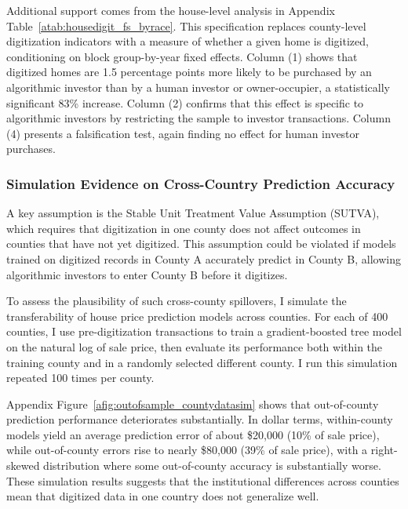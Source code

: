 \documentclass[11pt]{article}
\begin{document}
Additional support comes from the house-level analysis in Appendix Table~\ref{atab:housedigit_fs_byrace}. This specification replaces county-level digitization indicators with a measure of whether a given home is digitized, conditioning on block group-by-year fixed effects. Column (1) shows that digitized homes are 1.5 percentage points more likely to be purchased by an algorithmic investor than by a human investor or owner-occupier, a statistically significant 83\% increase. Column (2) confirms that this effect is specific to algorithmic investors by restricting the sample to investor transactions. Column (4) presents a falsification test, again finding no effect for human investor purchases.


\subsubsection{Simulation Evidence on Cross-Country Prediction Accuracy}\label{sec:robustness:sutva}
A key assumption is the Stable Unit Treatment Value Assumption (SUTVA), which requires that digitization in one county does not affect outcomes in counties that have not yet digitized. This assumption could be violated if models trained on digitized records in County A accurately predict in County B, allowing algorithmic investors to enter County B before it digitizes.

To assess the plausibility of such cross-county spillovers, I simulate the transferability of house price prediction models across counties. For each of 400 counties, I use pre-digitization transactions to train a gradient-boosted tree model on the natural log of sale price, then evaluate its performance both within the training county and in a randomly selected different county. I run this simulation repeated 100 times per county.

Appendix Figure~\ref{afig:outofsample_countydatasim} shows that out-of-county prediction performance deteriorates substantially. In dollar terms, within-county models yield an average prediction error of about \$20,000 (10\% of sale price), while out-of-county errors rise to nearly \$80,000 (39\% of sale price), with a right-skewed distribution where some out-of-county accuracy is substantially worse. These simulation results suggests that the institutional differences across counties mean that digitized data in one country does not generalize well.

\end{document}
